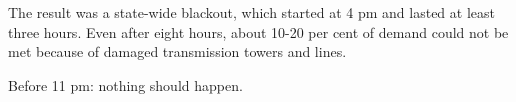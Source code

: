 \documentclass{article}
\begin{document}
The result was a state-wide blackout, which started at 4 pm and lasted at least three hours. Even after eight hours, about 10-20 per cent of demand could not be met because of damaged transmission towers and lines.

Before 11 pm: nothing should happen.
\end{document}
